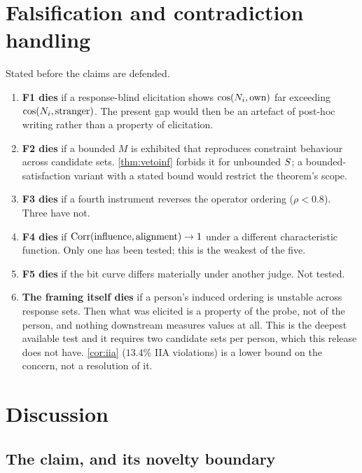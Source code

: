 \section{Falsification and contradiction handling}
\label{sec:falsify}

Stated before the claims are defended.

\begin{enumerate}
\item \textbf{F1 dies} if a response-blind elicitation shows
      $\cos(N_i,\text{own})$ far exceeding $\cos(N_i,\text{stranger})$. The
      present gap would then be an artefact of post-hoc writing rather than a
      property of elicitation.
\item \textbf{F2 dies} if a bounded $M$ is exhibited that reproduces
      constraint behaviour across candidate sets. \cref{thm:vetoinf} forbids it
      for unbounded $S$; a bounded-satisfaction variant with a stated bound
      would restrict the theorem's scope.
\item \textbf{F3 dies} if a fourth instrument reverses the operator ordering
      ($\rho<0.8$). Three have not.
\item \textbf{F4 dies} if $\operatorname{Corr}(\text{influence},\text{alignment})\to 1$ under a
      different characteristic function. Only one has been tested; this is the
      weakest of the five.
\item \textbf{F5 dies} if the bit curve differs materially under another judge.
      Not tested.
\item \textbf{The framing itself dies} if a person's induced ordering is unstable
      across response sets. Then what was elicited is a property of the probe,
      not of the person, and nothing downstream measures values at all. This is
      the deepest available test and it requires two candidate sets per person,
      which this release does not have. \cref{cor:iia} ($13.4\%$ IIA violations)
      is a lower bound on the concern, not a resolution of it.
\end{enumerate}

\section{Discussion}

\subsection{The claim, and its novelty boundary}

